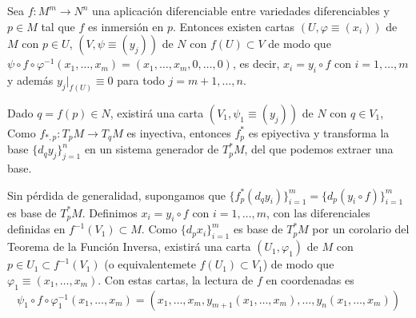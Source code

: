 \begin{teo} 
Sea $f:M^m \to N^n$ una aplicación diferenciable entre variedades diferenciables y $p\in M$ tal que $f$ es inmersión en $p$. Entonces existen cartas $(U,\varphi\equiv(x_i))$ de $M$ con $p\in U$, $(V,\psi\equiv(y_j))$ de $N$ con $f(U)\subset V$ de modo que $\psi \circ f \circ \varphi^{-1} (x_1,\dots,x_m) = (x_1,\ldots, x_m,0,\dots,0)$, es decir, $x_i = y_i \circ f$ con $i=1,\dots,m$ y además $y_j |_{f(U)} \equiv 0$ para todo $j = m+1,\dots, n$.
\end{teo}
\begin{dem}
Dado $q = f(p) \in N$, existirá una carta $(V_1,\psi_1\equiv (y_j))$ de $N$ con $q \in V_1$, Como $f_{*,p}:T_pM\to T_qM$ es inyectiva, entonces $f^*_p$ es epiyectiva y transforma la base $\{d_qy_j\}_{j=1}^n$ en un sistema generador de $T_p^* M$, del que podemos extraer una base.

Sin pérdida de generalidad, supongamos que $\{f^*_p(d_qy_i)\}_{i=1}^m = \{d_p(y_i \circ f)\}_{i=1}^m$ es base de $T^*_p M$. Definimos $x_i = y_i \circ f$ con $i = 1,\dots,m$, con las diferenciales definidas en $f^{-1}(V_1) \subset M$. Como $\{d_px_i\}_{i=1}^m$ es base de $T^*_p M$ por un corolario del Teorema de la Función Inversa, existirá una carta $(U_1,\varphi_1)$ de $M$ con $p\in U_1 \subset f^{-1}(V_1)$ (o equivalentemete $f(U_1) \subset V_1$) de modo que $\varphi_1 \equiv (x_1,\dots,x_m)$. Con estas cartas, la lectura de $f$ en coordenadas es $$\psi_1 \circ f \circ \varphi_1^{-1} (x_1,\dots,x_m) = (x_1,\dots,x_m,y_{m+1} (x_1,\dots,x_m),\dots,y_n (x_1,\dots,x_m))$$


\end{dem}
